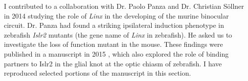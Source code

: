 I contributed to a collaboration with Dr. Paolo Panza and Dr. Christian S\"ollner in 2014 studying the role of \emph{Linx} in the developing of the murine binocular circuit.
Dr. Panza had found a striking ipsilateral induction phenotype in zebrafish \emph{Islr2} mutants (the gene name of \emph{Linx} in zebrafish).
He asked us to investigate the loss of function mutant in the mouse.
These findings were published in a manuscript in 2015 \cite{panza2015lrr}, which also explored the role of binding partners to Islr2 in the glial knot at the optic chiasm of zebrafish.
I have reproduced selected portions of the manuscript in this section.